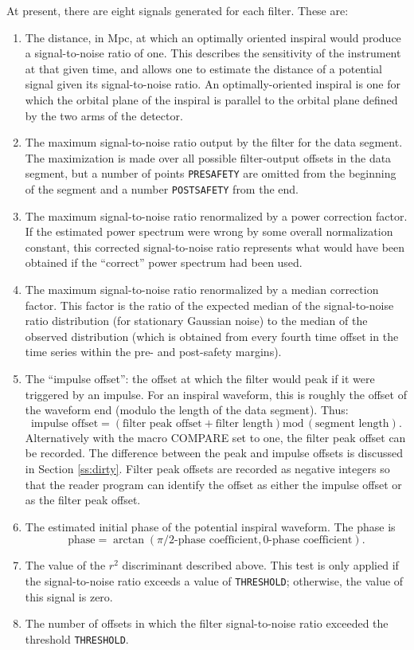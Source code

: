 At present, there are eight signals generated for each filter.  These are:
\begin{enumerate}
\item The distance, in Mpc, at which an optimally oriented inspiral would
  produce a signal-to-noise ratio of one.  This describes the sensitivity
  of the instrument at that given time, and allows one to estimate the
  distance of a potential signal given its signal-to-noise ratio.
  An optimally-oriented inspiral is one for which the orbital plane of
  the inspiral is parallel to the orbital plane defined by the two
  arms of the detector.
\item The maximum signal-to-noise ratio output by the filter for the data
  segment.  The maximization is made over all possible filter-output offsets in
  the data segment, but a number of points \texttt{PRESAFETY} are omitted
  from the beginning of the segment and a number \texttt{POSTSAFETY} from
  the end.
\item The maximum signal-to-noise ratio renormalized by a power correction
  factor.  If the estimated power spectrum were wrong by some overall
  normalization constant, this corrected signal-to-noise ratio represents
  what would have been obtained if the ``correct'' power spectrum had been
  used.
\item The maximum signal-to-noise ratio renormalized by a median correction
  factor.  This factor is the ratio of the expected median of the
  signal-to-noise ratio distribution (for stationary Gaussian noise) to
  the median of the observed distribution (which is obtained from every
  fourth time offset in the time series within the pre- and post-safety
  margins).
\item The ``impulse offset'': the offset at which the filter would peak if
  it were triggered by an impulse.  For an inspiral waveform, this is roughly
  the offset of the waveform end (modulo the length of the data segment).
  Thus:
\begin{equation}
\label{e:impulsevspeak}
    \mbox{impulse offset} = (\mbox{filter peak offset} + \mbox{filter length})
      {\mathrm{mod}}\, (\mbox{segment length}).
\end{equation}
	Alternatively with the macro COMPARE set to one, the filter
	peak offset can be recorded. The difference between the peak
	and impulse offsets is discussed in Section \ref{ss:dirty}. 
	Filter peak offsets are recorded
	as negative integers so that the reader program can identify 
	the offset as either the impulse offset or as the filter peak offset.
\item The estimated initial phase of the potential inspiral waveform.
  The phase is
  \[
    \mbox{phase} = \arctan(\mbox{$\pi/2$-phase coefficient},
      \mbox{0-phase coefficient}).
  \]
\item The value of the $r^2$ discriminant described above.  This test is only
  applied if the signal-to-noise ratio exceeds a value of \texttt{THRESHOLD};
  otherwise, the value of this signal is zero.
\item The number of offsets in which the filter signal-to-noise ratio exceeded
  the threshold \texttt{THRESHOLD}.
\end{enumerate}
